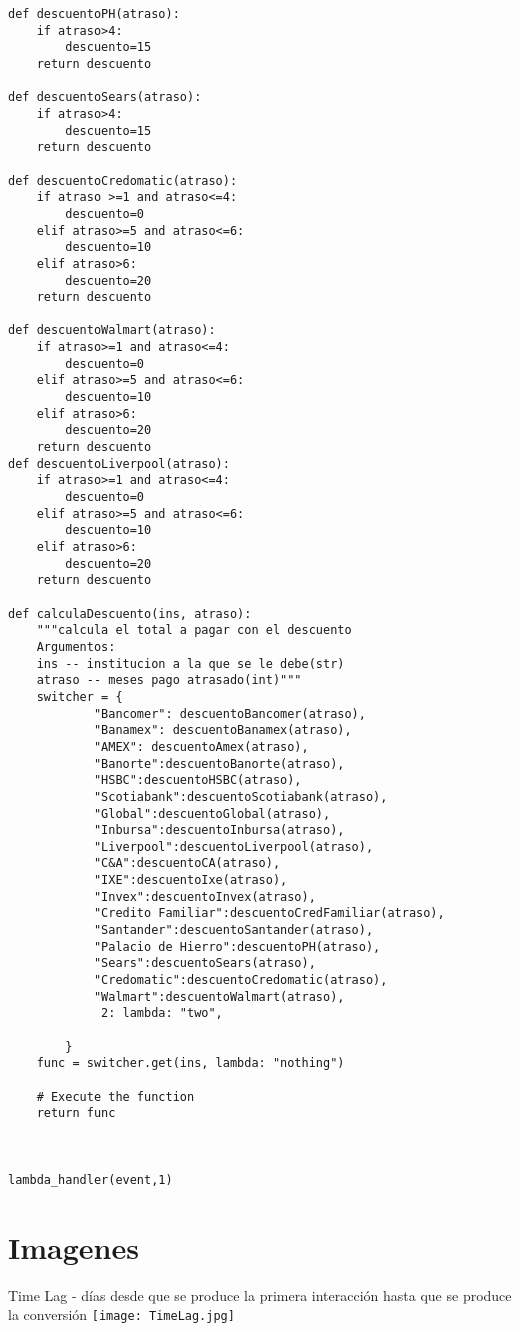 \begin{verbatim}
def descuentoPH(atraso):
    if atraso>4:
        descuento=15
    return descuento

def descuentoSears(atraso):
    if atraso>4:
        descuento=15
    return descuento

def descuentoCredomatic(atraso):
    if atraso >=1 and atraso<=4:
        descuento=0
    elif atraso>=5 and atraso<=6:
        descuento=10
    elif atraso>6:
        descuento=20
    return descuento

def descuentoWalmart(atraso):
    if atraso>=1 and atraso<=4:
        descuento=0
    elif atraso>=5 and atraso<=6:
        descuento=10
    elif atraso>6:
        descuento=20
    return descuento
def descuentoLiverpool(atraso):
    if atraso>=1 and atraso<=4:
        descuento=0
    elif atraso>=5 and atraso<=6:
        descuento=10
    elif atraso>6:
        descuento=20
    return descuento

def calculaDescuento(ins, atraso):
    """calcula el total a pagar con el descuento
    Argumentos:
    ins -- institucion a la que se le debe(str)
    atraso -- meses pago atrasado(int)"""
    switcher = {
            "Bancomer": descuentoBancomer(atraso),
            "Banamex": descuentoBanamex(atraso),
            "AMEX": descuentoAmex(atraso),
            "Banorte":descuentoBanorte(atraso),
            "HSBC":descuentoHSBC(atraso),
            "Scotiabank":descuentoScotiabank(atraso),
            "Global":descuentoGlobal(atraso),
            "Inbursa":descuentoInbursa(atraso),
            "Liverpool":descuentoLiverpool(atraso),
            "C&A":descuentoCA(atraso),
            "IXE":descuentoIxe(atraso),
            "Invex":descuentoInvex(atraso),
            "Credito Familiar":descuentoCredFamiliar(atraso),
            "Santander":descuentoSantander(atraso),
            "Palacio de Hierro":descuentoPH(atraso),
            "Sears":descuentoSears(atraso),
            "Credomatic":descuentoCredomatic(atraso),
            "Walmart":descuentoWalmart(atraso),
             2: lambda: "two",
    
        }
    func = switcher.get(ins, lambda: "nothing")
    
    # Execute the function
    return func



lambda_handler(event,1)

\end{verbatim}
\chapter{Imagenes} 
Time Lag - días desde que se produce la primera interacción hasta que se produce la conversión
\texttt{[image: TimeLag.jpg]}
